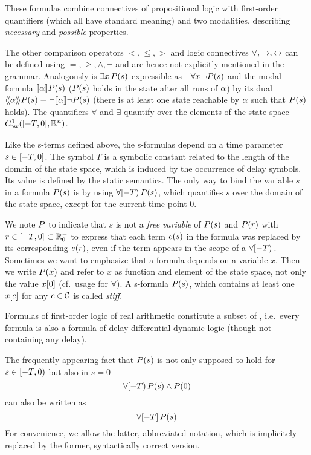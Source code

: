     These formulas combine connectives of propositional logic with first-order quantifiers (which all have standard meaning) and two modalities, describing \emph{necessary} and \emph{possible} properties.

    The other comparison operators $<,\leq,>$ and logic connectives $\lor,\rightarrow,\leftrightarrow$ can be defined using $=,\geq,\land,\lnot$ and are hence not explicitly mentioned in the grammar.
    Analogously is $\exists x{\,} P(s)$ expressible as $\lnot\forall x{\,} \lnot P(s)$ and the modal formula $\dbox{\asprg}{\asfml(s)}$ ($P(s)$ holds in the state after all runs of $\alpha$) by its dual $\ddiamond{\asprg}{\asfml(s)}\equiv\lnot\dbox{\asprg}{\lnot\asfml(s)}$ (there is at least one state reachable by $\alpha$ such that $P(s)$ holds).
    The quantifiers $\forall$ and $\exists$ quantify over the elements of the state space $\statespace$.

    Like the s-terms defined above, the s-formulas depend on a time parameter $s\in[-T,0]$. The symbol $T$ is a symbolic constant related to the length of the domain of the state space, which is induced by the occurrence of delay symbols. Its value is defined by the static semantics.
    The only way to bind the variable $s$ in a formula $P(s)$ is by using $\forall [-T){\,} P(s)$, which quantifies $s$ over the domain of the state space, except for the current time point $0$.

    We note $P$ to indicate that $s$ is not a \emph{free variable} of $P(s)$ and $P(r)$ with $r\in[-T,0]\subset\mathbb{R}^-_0$ to express that each term $e(s)$ in the formula was replaced by its corresponding $e(r)$, even if the term appears in the scope of a $\forall [-T){\,}$.
    Sometimes we want to emphasize that a formula depends on a variable $x$. Then we write $P(x)$ and refer to $x$ as function and element of the state space, not only the value $x[0]$ (cf.\ usage for $\forall$).
    A s-formula $P(s)$, which contains at least one $x[c]$ for any $c\in\mathcal{C}_{}$ is called \emph{stiff}.
    
    Formulas of first-order logic of real arithmetic constitute a subset of \ddL, i.e.\ every \FOLR formula is also a formula of delay differential dynamic logic (though not containing any delay).

    \begin{convention}
        The frequently appearing fact that $P(s)$ is not only supposed to hold for $s\in[-T,0)$ but also in $s=0$
        \begin{equation*}
            \forall [-T){\,} P(s)\land P(0)
        \end{equation*}
        can also be written as
        \begin{equation*}
            \forall [-T]{\,} P(s)
        \end{equation*}
        For convenience, we allow the latter, abbreviated notation, which is implicitely replaced by the former, syntactically correct version.
    \end{convention}

